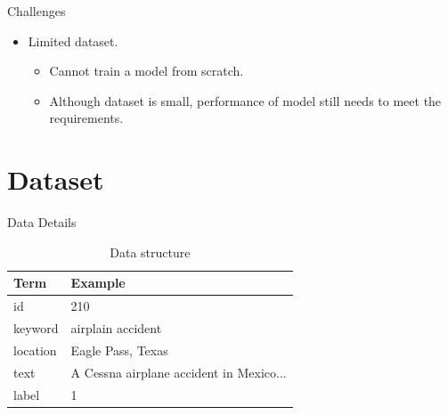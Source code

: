\documentclass[
 size=14pt,
 paper=smartboard,  %
 mode=present, 		%
 display=slides, 	%
 style=tuliplab,  	%
 pauseslide,
 fleqn,leqno]{powerdot}
\begin{document}
\begin{slide}[toc=,bm=]{Challenges}

\begin{itemize}
\item
Limited dataset.

\begin{itemize}
\item
Cannot train a model from scratch.

\item
Although dataset is small, performance of model still needs to meet the requirements.

\end{itemize}
\end{itemize}

\end{slide}



\section{Dataset}


\begin{slide}{Data Details}
\bigskip \bigskip \bigskip
\begin{table}[htbp]
	\setlength{\abovecaptionskip}{0pt}
	\setlength{\belowcaptionskip}{10pt}
	\centering
	\caption{Data structure}
	
	\begin{tabular}{ll}
		\hline
		Term                 & Example     \\
		\hline
		id     & 210                \\
		keyword          & airplain accident                         \\
		location         & Eagle Pass, Texas           \\
		text   & A Cessna airplane accident in Mexico...            \\
		label              & 1                   \\
		\hline
	\end{tabular}
\end{table}

\end{slide}
\end{document}
